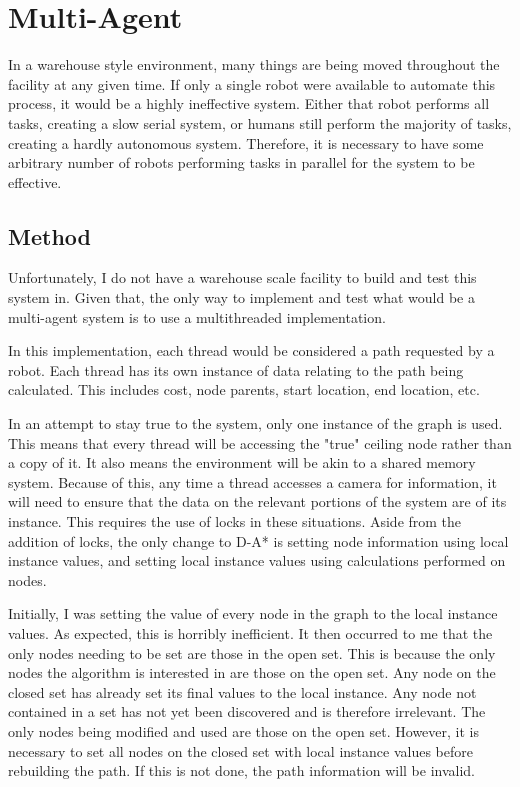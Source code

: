 \section{Multi-Agent}
In a warehouse style environment, many things are being moved throughout the facility at any given time. If only a single robot were available to automate this process, it would be a highly ineffective system. Either that robot performs all tasks, creating a slow serial system, or humans still perform the majority of tasks, creating a hardly autonomous system. Therefore, it is necessary to have some arbitrary number of robots performing tasks in parallel for the system to be effective.
\subsection{Method}
Unfortunately, I do not have a warehouse scale facility to build and test this system in. Given that, the only way to implement and test what would be a multi-agent system is to use a multithreaded implementation.

In this implementation, each thread would be considered a path requested by a robot. Each thread has its own instance of data relating to the path being calculated. This includes cost, node parents, start location, end location, etc. 

In an attempt to stay true to the system, only one instance of the graph is used. This means that every thread will be accessing the "true" ceiling node rather than a copy of it. It also means the environment will be akin to a shared memory system. Because of this, any time a thread accesses a camera for information, it will need to ensure that the data on the relevant portions of the system are of its instance. This requires the use of locks in these situations. Aside from the addition of locks, the only change to D-A* is setting node information using local instance values, and setting local instance values using calculations performed on nodes.


Initially, I was setting the value of every node in the graph to the local instance values. As expected, this is horribly inefficient. It then occurred to me that the only nodes needing to be set are those in the open set. This is because the only nodes the algorithm is interested in are those on the open set. Any node on the closed set has already set its final values to the local instance. Any node not contained in a set has not yet been discovered and is therefore irrelevant. The only nodes being modified and used are those on the open set. However, it is necessary to set all nodes on the closed set with local instance values before rebuilding the path. If this is not done, the path information will be invalid. 

